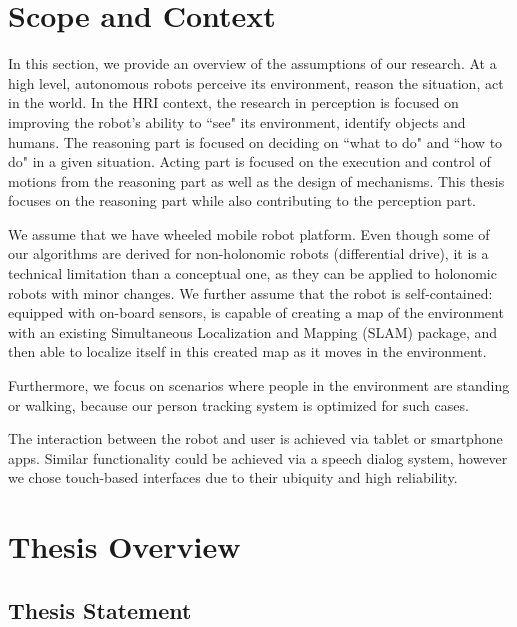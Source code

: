 \documentclass[12pt]{gatech-thesis}
\begin{document}




\section{Scope and Context}

In this section, we provide an overview of the assumptions of our research.  At a high level, autonomous robots perceive its environment, reason the situation, act in the world. In the HRI context, the research in perception is focused on improving the robot's ability to ``see" its environment, identify objects and humans. The reasoning part is focused on deciding on ``what to do" and ``how to do" in a given situation. Acting part is focused on the execution and control of motions from the reasoning part as well as the design of mechanisms. This thesis focuses on the reasoning part while also contributing to the perception part.

We assume that we have wheeled mobile robot platform. Even though some of our algorithms are derived for non-holonomic robots (differential drive), it is a technical limitation than a conceptual one, as they can be applied to holonomic robots with minor changes. We further assume that the robot is self-contained: equipped with on-board sensors, is capable of creating a map of the environment with an existing Simultaneous Localization and Mapping (SLAM) package, and then able to localize itself in this created map as it moves in the environment.

Furthermore, we focus on scenarios where people in the environment are standing or walking, because our person tracking system is optimized for such cases. 

The interaction between the robot and user is achieved via tablet or smartphone apps. Similar functionality could be achieved via a speech dialog system, however we chose touch-based interfaces due to their ubiquity and high reliability.



\section{Thesis Overview}
\subsection{Thesis Statement}
\end{document}
